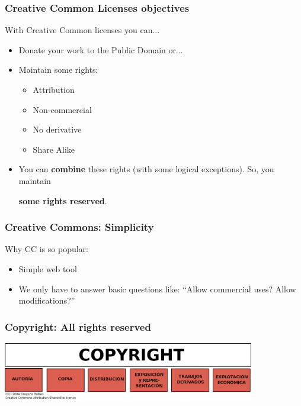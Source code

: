 
\begin{frame}
\frametitle{Creative Common Licenses objectives}

With Creative Common licenses you can...

\begin{itemize}
\item Donate your work to the Public Domain or...
\item Maintain some rights:
\begin{itemize}
\item Attribution
\item Non-commercial
\item No derivative
\item Share Alike
\end{itemize}
\item You can {\bf combine} these rights (with some logical exceptions). So, you maintain
\begin{center}
{\LARGE{\bf some rights reserved}}.
\end{center}
\end{itemize}

\end{frame}


\begin{frame}
\frametitle{Creative Commons: Simplicity}

Why CC is so popular:

\begin{itemize}
\item Simple web tool
\item We only have to answer basic questions like: ``Allow commercial uses? Allow modifications?''
\end{itemize}

\end{frame}



\begin{frame}
\frametitle{Copyright: All rights reserved}

\includegraphics[width=11cm]{figs/Copyright.png}

\end{frame}

